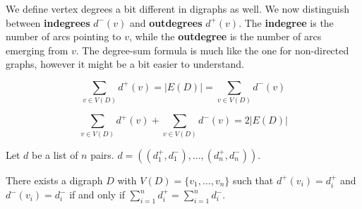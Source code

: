 We define vertex degrees a bit different in digraphs as well. We now distinguish between \textbf{indegrees} $d^{-}(v)$ and \textbf{outdegrees} $d^{+}(v)$. The \textbf{indegree} is the number of arcs pointing to $v$, while the \textbf{outdegree} is the number of arcs emerging from $v$. The degree-sum formula is much like the one for non-directed graphs, however it might be a bit easier to understand.

\begin{theorem}
	\begin{equation*}
		\sum_{v \in V(D)} d^{+}(v) = |E(D)| = \sum_{v \in V(D)} d^{-}(v)
	\end{equation*}
\end{theorem}

\begin{corollary}
	\begin{equation*}
		\sum_{v \in V(D)} d^{+}(v) + \sum_{v \in V(D)} d^{-}(v) = 2|E(D)|
	\end{equation*}
\end{corollary}

\begin{proposition}
	Let $d$ be a list of $n$ pairs. $d = ((d^{+}_{1}, d^{-}_{1}), \ldots, (d^{+}_{n}, d^{-}_{n}))$.

	There exists a digraph $D$ with $V(D) = \{v_{1}, \ldots, v_{n}\}$ such that $d^{+}(v_{i}) = d_{i}^+$ and $d^{-}(v_{i}) = d^{-}_{i}$ if and only if $\sum_{i=1}^n d_{i}^{+} = \sum_{i=1}^n d_{i}^{-}$.
\end{proposition}

